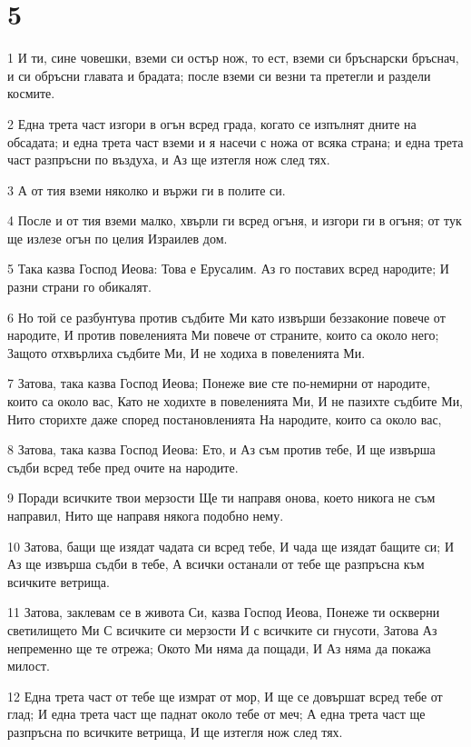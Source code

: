 \chapter{5}

\par 1 И ти, сине човешки, вземи си остър нож, то ест, вземи си бръснарски бръснач, и си обръсни главата и брадата; после вземи си везни та претегли и раздели космите.
\par 2 Една трета част изгори в огън всред града, когато се изпълнят дните на обсадата; и една трета част вземи и я насечи с ножа от всяка страна; и една трета част разпръсни по въздуха, и Аз ще изтегля нож след тях.
\par 3 А от тия вземи няколко и вържи ги в полите си.
\par 4 После и от тия вземи малко, хвърли ги всред огъня, и изгори ги в огъня; от тук ще излезе огън по целия Израилев дом.
\par 5 Така казва Господ Иеова: Това е Ерусалим. Аз го поставих всред народите; И разни страни го обикалят.
\par 6 Но той се разбунтува против съдбите Ми като извърши беззаконие повече от народите, И против повеленията Ми повече от страните, които са около него; Защото отхвърлиха съдбите Ми, И не ходиха в повеленията Ми.
\par 7 Затова, така казва Господ Иеова; Понеже вие сте по-немирни от народите, които са около вас, Като не ходихте в повеленията Ми, И не пазихте съдбите Ми, Нито сторихте даже според постановленията На народите, които са около вас,
\par 8 Затова, така казва Господ Иеова: Ето, и Аз съм против тебе, И ще извърша съдби всред тебе пред очите на народите.
\par 9 Поради всичките твои мерзости Ще ти направя онова, което никога не съм направил, Нито ще направя някога подобно нему.
\par 10 Затова, бащи ще изядат чадата си всред тебе, И чада ще изядат бащите си; И Аз ще извърша съдби в тебе, А всички останали от тебе ще разпръсна към всичките ветрища.
\par 11 Затова, заклевам се в живота Си, казва Господ Иеова, Понеже ти оскверни светилището Ми С всичките си мерзости И с всичките си гнусоти, Затова Аз непременно ще те отрежа; Окото Ми няма да пощади, И Аз няма да покажа милост.
\par 12 Една трета част от тебе ще измрат от мор, И ще се довършат всред тебе от глад; И една трета част ще паднат около тебе от меч; А една трета част ще разпръсна по всичките ветрища, И ще изтегля нож след тях.
